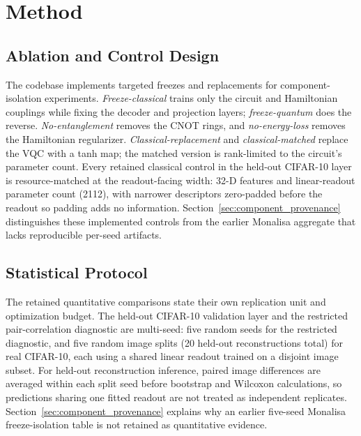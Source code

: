 \documentclass[11pt]{article}
\begin{document}
\section{Method}

\subsection{Ablation and Control Design}
The codebase implements targeted freezes and replacements for component-isolation experiments. \emph{Freeze-classical} trains only the circuit and Hamiltonian couplings while fixing the decoder and projection layers; \emph{freeze-quantum} does the reverse. \emph{No-entanglement} removes the CNOT rings, and \emph{no-energy-loss} removes the Hamiltonian regularizer. \emph{Classical-replacement} and \emph{classical-matched} replace the VQC with a tanh map; the matched version is rank-limited to the circuit's parameter count. Every retained classical control in the held-out CIFAR-10 layer is resource-matched at the readout-facing width: 32-D features and linear-readout parameter count (2112), with narrower descriptors zero-padded before the readout so padding adds no information. Section~\ref{sec:component_provenance} distinguishes these implemented controls from the earlier Monalisa aggregate that lacks reproducible per-seed artifacts.

\subsection{Statistical Protocol}
The retained quantitative comparisons state their own replication unit and optimization budget. The held-out CIFAR-10 validation layer and the restricted pair-correlation diagnostic are multi-seed: five random seeds for the restricted diagnostic, and five random image splits (20 held-out reconstructions total) for real CIFAR-10, each using a shared linear readout trained on a disjoint image subset. For held-out reconstruction inference, paired image differences are averaged within each split seed before bootstrap and Wilcoxon calculations, so predictions sharing one fitted readout are not treated as independent replicates. Section~\ref{sec:component_provenance} explains why an earlier five-seed Monalisa freeze-isolation table is not retained as quantitative evidence.
\end{document}
